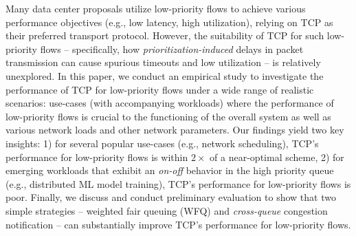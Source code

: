 Many data center proposals utilize low-priority flows to achieve various performance objectives (e.g., low latency, high utilization), relying on TCP as their preferred transport protocol. However, the suitability of TCP for such low-priority flows -- specifically, how \emph{prioritization-induced} delays in packet transmission can cause spurious timeouts and low utilization -- is relatively unexplored.  
In this paper, we conduct an empirical study to investigate the performance of TCP for low-priority flows under a wide range of realistic scenarios: use-cases (with accompanying workloads) where the performance of low-priority flows is crucial to the functioning of the overall system as well as various network loads and other network parameters. Our findings yield two key insights: 1) for several popular use-cases (e.g., network scheduling), TCP's performance for low-priority flows is within $2\times$ of a near-optimal scheme, 2) for emerging workloads that exhibit an \emph{on-off} behavior in the high priority queue (e.g., distributed ML model training), TCP's performance for low-priority flows is poor. 
Finally, we discuss and conduct preliminary evaluation to show that two simple strategies -- weighted fair queuing (WFQ) and \emph{cross-queue} congestion notification -- can substantially improve TCP's performance for low-priority flows. 